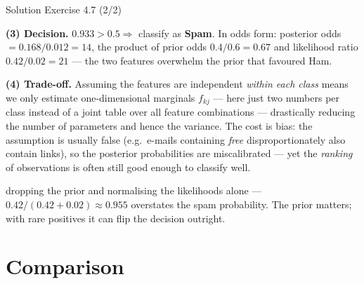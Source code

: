 \documentclass[aspectratio=169,11pt]{beamer}
\begin{document}
\begin{frame}{Solution \textemdash{} Exercise 4.7 (2/2)}
\begin{solutionbox}
\textbf{(3) Decision.} $0.933>0.5 \Rightarrow$ classify as
\textbf{Spam}. In odds form: posterior odds
$=0.168/0.012 = 14$, the product of prior odds
$0.4/0.6=0.67$ and likelihood ratio $0.42/0.02=21$ --- the two features
overwhelm the prior that favoured Ham.

\vspace{1mm}
\textbf{(4) Trade-off.}
Assuming the features are independent \emph{within each class} means we
only estimate one-dimensional marginals $f_{kj}$ --- here just two
numbers per class instead of a joint table over all feature
combinations --- drastically reducing
the number of parameters and hence the variance. The cost is bias: the
assumption is usually false (e.g.\ e-mails containing \emph{free}
disproportionately also contain links), so the posterior
probabilities are miscalibrated --- yet the \emph{ranking} of
observations is often still good enough to classify well.
\end{solutionbox}
\begin{mistake}
dropping the prior and normalising the
likelihoods alone --- $0.42/(0.42+0.02)\approx 0.955$ overstates the
spam probability. The prior matters; with rare positives it can flip
the decision outright.
\end{mistake}
\end{frame}









\section{Comparison}
\end{document}
